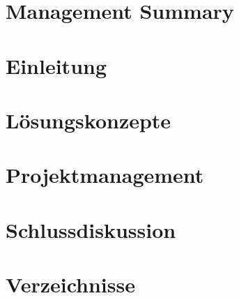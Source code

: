 \documentclass[11pt]{scrartcl}
\begin{document}
        
        \clearpage

        \setcounter{tocdepth}{2}
        \tableofcontents
        \clearpage

        \section{Management Summary}
        
        \clearpage
        \section{Einleitung}
        
        \clearpage
        \section{Lösungskonzepte}
        
        \clearpage
        
        \clearpage
        
        \clearpage
        
        \clearpage
        
        \clearpage
        
        \clearpage
        
        \clearpage
        
        \clearpage
        
        \clearpage
        
        \clearpage
        
        \clearpage
        
        \clearpage
        \section{Projektmanagement}
        
        \clearpage
        \section{Schlussdiskussion}
        
        \clearpage
        \section{Verzeichnisse}
        \listoffigures
        \listoftables
        

    
\end{document}

